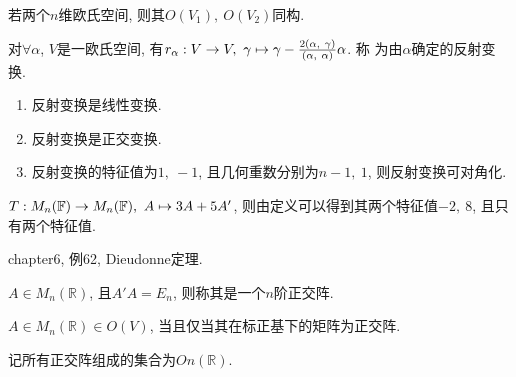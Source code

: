 \begin{example}
    若两个$n$维欧氏空间, 则其$O(V_1),\ O(V_2)$同构.
\end{example}

\begin{definition}[反射变换]
    对$\forall \alpha$, $V$是一欧氏空间, 有$\defmap{r_{\alpha}}{V}{V}{\gamma}{\gamma-\frac{2(\alpha,\ \gamma)}{(\alpha,\ \alpha)}\alpha}$. 称
    为由$\alpha$确定的反射变换.
\end{definition}

\begin{property}
    \par
    \begin{enumerate}[itemindent=1em]
        \item 反射变换是线性变换.
        \item 反射变换是正交变换.
        \item 反射变换的特征值为$1,\ -1$, 且几何重数分别为$n-1,\ 1$, 则反射变换可对角化.
    \end{enumerate}
\end{property}

\begin{example}
    $T: M_{n}(\mathbb{F}) \to M_{n}(\mathbb{F}),\ A \mapsto 3A+5A'$, 则由定义可以得到其两个特征值$-2,\ 8$, 且只有两个特征值.
\end{example}

\begin{example}
    chapter6, 例62, Dieudonne定理.
\end{example}

\begin{definition}[正交阵]
    $A\in M_n(\mathbb{R})$, 且$A'A=E_n$, 则称其是一个$n$阶正交阵.
\end{definition}

\begin{theorem}[正交阵的充要条件]
    $A\in M_n(\mathbb{R})\in O(V)$, 当且仅当其在标正基下的矩阵为正交阵.\par
    记所有正交阵组成的集合为$On(\mathbb{R})$.
\end{theorem}

